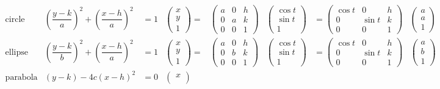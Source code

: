 \documentclass[
]{book}
\theoremstyle{definition}
\theoremstyle{definition}
\theoremstyle{definition}
\theoremstyle{definition}
\theoremstyle{remark}
\begin{document}
\[
\begin{array}{cccccccc}
\text{circle} & \left(\dfrac{y-k}{a}\right)^{2}+\left(\dfrac{x-h}{a}\right)^{2} & =1 & \begin{pmatrix}x\\
y\\
1
\end{pmatrix}= & \begin{pmatrix}a & 0 & h\\
0 & a & k\\
0 & 0 & 1
\end{pmatrix} & \begin{pmatrix}\cos t\\
\sin t\\
1
\end{pmatrix} & =\begin{pmatrix}\cos t & 0 & h\\
0 & \sin t & k\\
0 & 0 & 1
\end{pmatrix} & \begin{pmatrix}a\\
a\\
1
\end{pmatrix}\\
\text{ellipse} & \left(\dfrac{y-k}{b}\right)^{2}+\left(\dfrac{x-h}{a}\right)^{2} & =1 & \begin{pmatrix}x\\
y\\
1
\end{pmatrix}= & \begin{pmatrix}a & 0 & h\\
0 & b & k\\
0 & 0 & 1
\end{pmatrix} & \begin{pmatrix}\cos t\\
\sin t\\
1
\end{pmatrix} & =\begin{pmatrix}\cos t & 0 & h\\
0 & \sin t & k\\
0 & 0 & 1
\end{pmatrix} & \begin{pmatrix}a\\
b\\
1
\end{pmatrix}\\
\text{parabola} & \left(y-k\right)-4c\left(x-h\right)^{2} & =0 & \begin{pmatrix}x\\

\end{pmatrix}
\end{array}\]
\end{document}
